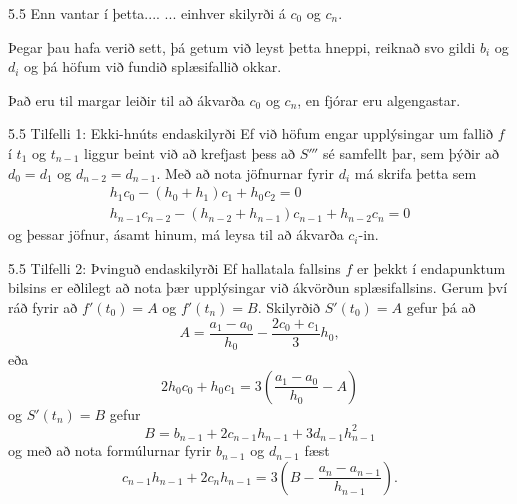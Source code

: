 \begin{frame}{5.5 Enn vantar í þetta....} 
... einhver skilyrði á $c_0$ og $c_n$. 

\pause
\smallskip
Þegar þau hafa verið sett, þá  getum við leyst þetta hneppi, reiknað svo
gildi $b_i$ og  $d_i$ og þá höfum við fundið splæsifallið okkar. 

\pause
\smallskip
Það eru til margar
leiðir til að ákvarða $c_0$ og $c_n$, en fjórar eru algengastar. 
\end{frame}

\begin{frame}{5.5  Tilfelli 1: Ekki-hnúts endaskilyrði} 
Ef við höfum engar upplýsingar um fallið $f$ í $t_1$ og $t_{n-1}$
liggur beint við að krefjast þess að $S'''$ sé samfellt þar, sem þýðir
að $d_0 = d_1$ og $d_{n-2} = d_{n-1}$. Með að nota jöfnurnar fyrir
$d_i$ má skrifa þetta sem 
\begin{align*}
	h_1c_0 - (h_0 + h_1)c_1 + h_0c_2 = 0 \\
	h_{n-1}c_{n-2}-(h_{n-2}+h_{n-1})c_{n-1}+h_{n-2}c_n = 0
\end{align*}
og þessar jöfnur, ásamt hinum, má leysa til að ákvarða $c_i$-in.
\end{frame}

\begin{frame}{5.5 Tilfelli 2: Þvinguð endaskilyrði} 
Ef hallatala fallsins $f$ er þekkt í endapunktum bilsins er eðlilegt að nota þær upplýsingar við ákvörðun splæsifallsins. Gerum því ráð fyrir að $f'(t_0) = A$ og $f'(t_n) = B$. Skilyrðið $S'(t_0) = A$ gefur þá að
\begin{equation*}
	A = \frac{a_1-a_0}{h_0} - \frac{2c_0+c_1}{3}h_0,
\end{equation*} 
eða
\begin{equation*}
	2h_0c_0 + h_0c_1 = 
	3 \left( \frac{a_1-a_0}{h_0} - A \right)
\end{equation*}
og $S'(t_n) = B$ gefur
\begin{equation*}
	B = b_{n-1} + 2c_{n-1}h_{n-1} + 3d_{n-1}h_{n-1}^2
\end{equation*}
og með að nota formúlurnar fyrir $b_{n-1}$ og $d_{n-1}$ fæst
\begin{equation*}
	c_{n-1}h_{n-1} + 2c_nh_{n-1} = 
	3 \left( B  - \frac{a_n-a_{n-1}}{h_{n-1}} \right).
\end{equation*}
\end{frame}

